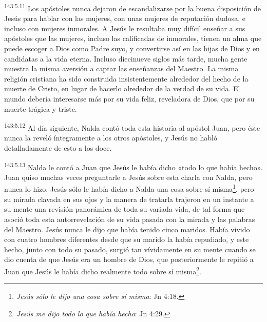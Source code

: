 \par
\textsuperscript{143:5.11} Los apóstoles nunca dejaron de escandalizarse por la buena disposición de Jesús para hablar con las mujeres, con unas mujeres de reputación dudosa, e incluso con mujeres inmorales. A Jesús le resultaba muy difícil enseñar a sus apóstoles que las mujeres, incluso las calificadas de inmorales, tienen un alma que puede escoger a Dios como Padre suyo, y convertirse así en las hijas de Dios y en candidatas a la vida eterna. Incluso diecinueve siglos más tarde, mucha gente muestra la misma aversión a captar las enseñanzas del Maestro. La misma religión cristiana ha sido construida insistentemente alrededor del hecho de la muerte de Cristo, en lugar de hacerlo alrededor de la verdad de su vida. El mundo debería interesarse más por su vida feliz, reveladora de Dios, que por su muerte trágica y triste.

\par
\textsuperscript{143:5.12} Al día siguiente, Nalda contó toda esta historia al apóstol Juan, pero éste nunca la reveló íntegramente a los otros apóstoles, y Jesús no habló detalladamente de esto a los doce.

\par
\textsuperscript{143:5.13} Nalda le contó a Juan que Jesús le había dicho «todo lo que había hecho». Juan quiso muchas veces preguntarle a Jesús sobre esta charla con Nalda, pero nunca lo hizo. Jesús sólo le había dicho a Nalda una cosa sobre sí misma\footnote{\textit{Jesús sólo le dijo una cosa sobre sí misma}: Jn 4:18.}, pero su mirada clavada en sus ojos y la manera de tratarla trajeron en un instante a su mente una revisión panorámica de toda su variada vida, de tal forma que asoció toda esta autorrevelación de su vida pasada con la mirada y las palabras del Maestro. Jesús nunca le dijo que había tenido cinco maridos. Había vivido con cuatro hombres diferentes desde que su marido la había repudiado, y este hecho, junto con todo su pasado, surgió tan vívidamente en su mente cuando se dio cuenta de que Jesús era un hombre de Dios, que posteriormente le repitió a Juan que Jesús le había dicho realmente todo sobre sí misma\footnote{\textit{Jesús me dijo todo lo que había hecho}: Jn 4:29.}.

